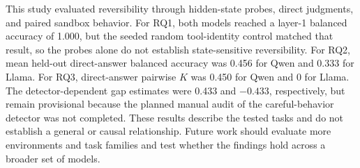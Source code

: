 \documentclass[conference]{IEEEtran}
\begin{document}
This study evaluated reversibility through hidden-state probes, direct
judgments, and paired sandbox behavior. For RQ1, both models reached a layer-1
balanced accuracy of 1.000, but the seeded random tool-identity control
matched that result, so the probes alone do not establish state-sensitive
reversibility. For RQ2, mean held-out direct-answer balanced accuracy was
0.456 for Qwen and 0.333 for Llama. For RQ3, direct-answer pairwise $K$ was
0.450 for Qwen and 0 for Llama. The detector-dependent gap estimates were
0.433 and $-0.433$, respectively, but remain provisional because the planned
manual audit of the careful-behavior detector was not completed. These results
describe the tested tasks and do not establish a general or causal
relationship. Future work should evaluate more environments and task families
and test whether the findings hold across a broader set of models.



\end{document}
